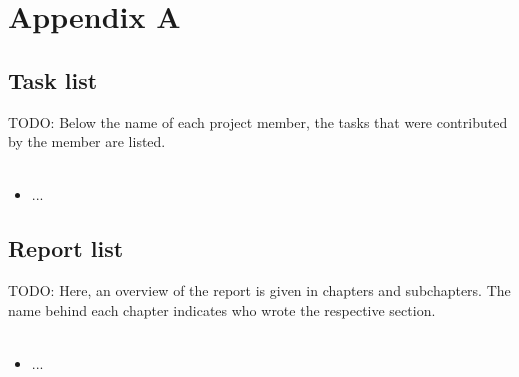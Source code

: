 
\section{Appendix A}

\subsection{Task list}

TODO: Below the name of each project member, the tasks that were contributed by the member are listed.
\\
\\

\begin{itemize}
\item ...
\end{itemize}

\subsection{Report list}

TODO: Here, an overview of the report is given in chapters and subchapters. The name behind each chapter indicates who wrote the respective section.
\\
\\
\begin{itemize}
\item ...
\end{itemize}